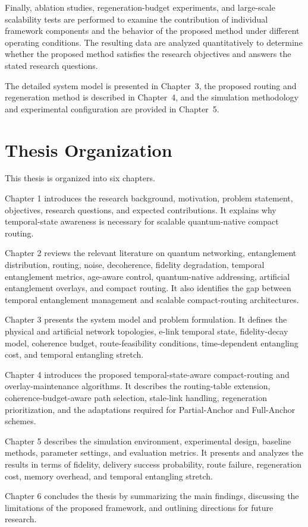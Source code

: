 Finally, ablation studies, regeneration-budget experiments, and large-scale scalability tests are performed to examine the contribution of individual framework components and the behavior of the proposed method under different operating conditions. The resulting data are analyzed quantitatively to determine whether the proposed method satisfies the research objectives and answers the stated research questions.

The detailed system model is presented in Chapter~3, the proposed routing and regeneration method is described in Chapter~4, and the simulation methodology and experimental configuration are provided in Chapter~5.

\section{Thesis Organization}
This thesis is organized into six chapters.

Chapter 1 introduces the research background, motivation, problem statement, objectives, research questions, and expected contributions. It explains why temporal-state awareness is necessary for scalable quantum-native compact routing.

Chapter 2 reviews the relevant literature on quantum networking, entanglement distribution, routing, noise, decoherence, fidelity degradation, temporal entanglement metrics, age-aware control, quantum-native addressing, artificial entanglement overlays, and compact routing. It also identifies the gap between temporal entanglement management and scalable compact-routing architectures.

Chapter 3 presents the system model and problem formulation. It defines the physical and artificial network topologies, e-link temporal state, fidelity-decay model, coherence budget, route-feasibility conditions, time-dependent entangling cost, and temporal entangling stretch.

Chapter 4 introduces the proposed temporal-state-aware compact-routing and overlay-maintenance algorithms. It describes the routing-table extension, coherence-budget-aware path selection, stale-link handling, regeneration prioritization, and the adaptations required for Partial-Anchor and Full-Anchor schemes.

Chapter 5 describes the simulation environment, experimental design, baseline methods, parameter settings, and evaluation metrics. It presents and analyzes the results in terms of fidelity, delivery success probability, route failure, regeneration cost, memory overhead, and temporal entangling stretch.

Chapter 6 concludes the thesis by summarizing the main findings, discussing the limitations of the proposed framework, and outlining directions for future research.